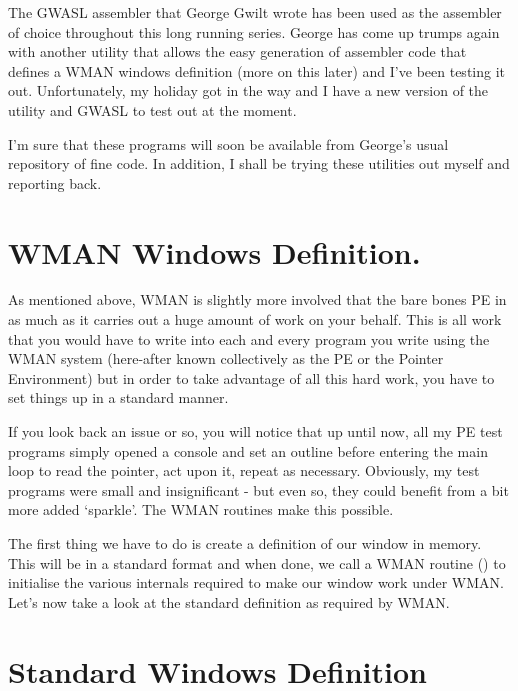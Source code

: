 The GWASL assembler that George Gwilt wrote has been used as the
    assembler of choice throughout this long running series. George has come up
    trumps again with another utility that allows the easy generation of
    assembler code that defines a WMAN windows definition (more on this later)
    and I've been testing it out. Unfortunately, my holiday got in the way and
    I have a new version of the utility and GWASL to test out at the
    moment.

I'm sure that these programs will soon be available from George's
    usual repository of fine code. In addition, I shall be trying these
    utilities out myself and reporting back.

\section{WMAN Windows Definition.}
\label{ch22-wdef-intro}%

As mentioned above, WMAN is slightly more involved that the bare
    bones PE in as much as it carries out a huge amount of work on your
    behalf. This is all work that you would have to write into each and every
    program you write using the WMAN system (here-{}after known collectively
    as the PE or the Pointer Environment) but in order to take advantage of
    all this hard work, you have to set things up in a standard manner.

If you look back an issue or so, you will notice that up until now,
    all my PE test programs simply opened a console and set an outline before
    entering the main loop to read the pointer, act upon it, repeat as
    necessary. Obviously, my test programs were small and insignificant -{} but
    even so, they could benefit from a bit more added `sparkle'. The WMAN
    routines make this possible.

The first thing we have to do is create a definition of our window
    in memory. This will be in a standard format and when done, we call a WMAN
    routine () to initialise the various internals required to make
    our window work under WMAN. Let's now take a look at the standard
    definition as required by WMAN.

\section{Standard Windows Definition}
\label{ch22-wdef}%

